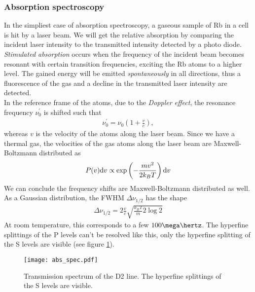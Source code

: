 \subsubsection{Absorption spectroscopy}
In the simpliest case of absorption spectroscopy, a gaseous sample of Rb in a cell is hit by a laser beam. We will get the relative absorption by comparing the incident laser intensity to the transmitted intensity detected by a photo diode. \emph{Stimulated absorption} occurs when the frequency of the incident beam becomes resonant with certain transition frequencies, exciting the Rb atoms to a higher level. The gained energy will be emitted \emph{spontaneously} in all directions, thus a fluorescence of the gas and a decline in the transmitted laser intensity are detected.\\
In the reference frame of the atoms, due to the \emph{Doppler effect}, the resonance frequency $\nu_0^\prime$ is shifted such that
\begin{align}
\nu_0^\prime=\nu_0\left(1+\frac{v}{c}\right),
\end{align}
whereas $v$ is the velocity of the atoms along the laser beam. Since we have a thermal gas, the velocities of the gas atoms along the laser beam are Maxwell-Boltzmann distributed as
\begin{align}
P(v)\mathrm{d} v\propto \exp\left(-\frac{mv^2}{2k_B T}\right)\mathrm{d} v
\end{align}
We can conclude the frequency shifts are Maxwell-Boltzmann distributed as well. As a Gaussian distribution, the FWHM $\Delta\nu_{1/2}$ has the shape
\begin{align}
\Delta\nu_{1/2}=2\frac{v}{c}\sqrt{\frac{k_B T}{m}2\log 2}
\end{align}
At room temperature, this corresponds to a few $100\mega\hertz$. The hyperfine splittings of the P levels can't be resolved like this, only the hyperfine splitting of the S levels are visible (see figure \ref{fig:abs_spec}).
\begin{figure}[h]
	\centering
	\texttt{[image: abs\_spec.pdf]}
	\caption{Transmission spectrum of the D2 line. The hyperfine splittings of the S levels are visible. \cite{lit:AK_manual2012}}
	\label{fig:abs_spec}
\end{figure}
